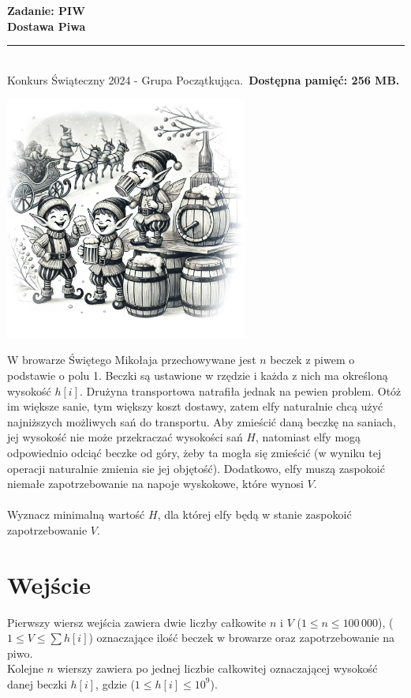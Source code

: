 \documentclass[a4paper,11pt]{article}
\newcommand{\tasktitle}{Dostawa Piwa}
\newcommand{\taskshort}{PIW}
\newcommand{\contestinfo}{Konkurs Świąteczny 2024 - Grupa Początkująca.}
\newcommand{\memorylimit}{256 MB}
\begin{document}
\noindent\textbf{\LARGE Zadanie: \taskshort} \\
\textbf{\Large \tasktitle} \\
\rule{\textwidth}{0.4pt} \\
\small \contestinfo \
\textbf{Dostępna pamięć: \memorylimit.}

\begin{center}
\includegraphics[width=0.6\textwidth]{elfy_zadanie_piwo.jpg} %
\end{center}

\noindent W browarze Świętego Mikołaja przechowywane jest $n$ beczek z piwem o podstawie o polu 1. Beczki są ustawione w rzędzie i każda z nich ma określoną wysokość $h[i]$. Drużyna transportowa natrafiła jednak na pewien problem. Otóż im większe sanie, tym większy koszt dostawy, zatem elfy naturalnie chcą użyć najniższych możliwych sań do transportu. Aby zmieścić daną beczkę na saniach, jej wysokość nie może przekraczać wysokości sań $H$, natomiast elfy mogą odpowiednio odciąć beczke od góry, żeby ta mogła się zmieścić (w wyniku tej operacji naturalnie zmienia sie jej objętość). Dodatkowo, elfy muszą zaspokoić niemałe zapotrzebowanie na napoje wyskokowe, które wynosi $V$.\\\\Wyznacz minimalną wartość $H$, dla której elfy będą w stanie zaspokoić zapotrzebowanie $V$.


\section*{Wejście}
Pierwszy wiersz wejścia zawiera dwie liczby całkowite $n$ i $V$ ($1 \leq n \leq 100\,000$), ($1 \leq V \leq \sum h[i]$) oznaczające ilość beczek w browarze oraz zapotrzebowanie na piwo.\\Kolejne $n$ wierszy zawiera po jednej liczbie całkowitej oznaczającej wysokość danej beczki $h[i]$, gdzie ($1 \leq h[i] \leq 10^9$).
\end{document}
